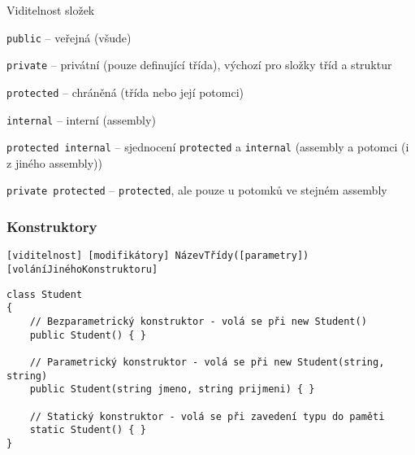 



\begin{frame}[fragile]
\begin{bitemize}{Viditelnost složek}
\item \lstinline|public| -- veřejná (všude)
\item \lstinline|private| -- privátní (pouze definující třída), výchozí pro složky tříd a struktur
\item \lstinline|protected| -- chráněná (třída nebo její potomci)
\item \lstinline|internal| -- interní (assembly)
\item \lstinline|protected internal| -- sjednocení \lstinline|protected| a \lstinline|internal| (assembly a potomci (i z jiného assembly))
\item \lstinline|private protected| -- \lstinline|protected|, ale pouze u potomků ve stejném assembly
\end{bitemize}
\end{frame}









\begin{frame}[fragile]
\frametitle{Konstruktory}
\vfill
\begin{noteblock}{}
\begin{lstlisting}
[viditelnost] [modifikátory] NázevTřídy([parametry]) [voláníJinéhoKonstruktoru]
\end{lstlisting}
\end{noteblock}
\vfill
\begin{yesblock}
\begin{lstlisting}[basicstyle=\small]
class Student
{
    // Bezparametrický konstruktor - volá se při new Student()
    public Student() { }

    // Parametrický konstruktor - volá se při new Student(string, string)
    public Student(string jmeno, string prijmeni) { }

    // Statický konstruktor - volá se při zavedení typu do paměti
    static Student() { }
}
\end{lstlisting}
\end{yesblock}
\vfill
\end{frame}



